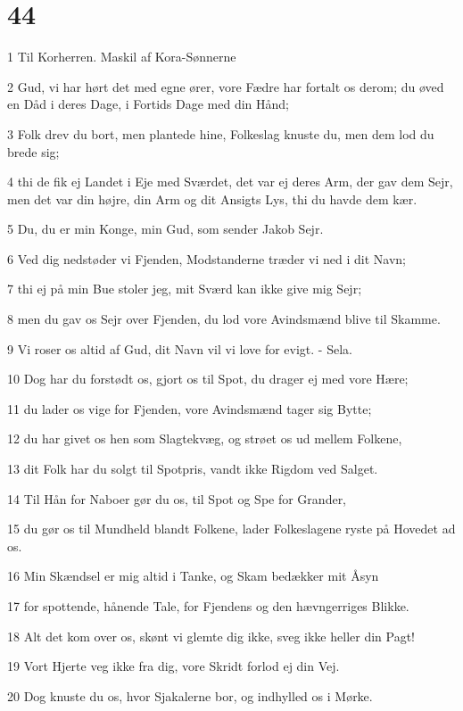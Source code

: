 \chapter{44}

\par 1 Til Korherren. Maskil af Kora-Sønnerne
\par 2 Gud, vi har hørt det med egne ører, vore Fædre har fortalt os derom; du øved en Dåd i deres Dage, i Fortids Dage med din Hånd;
\par 3 Folk drev du bort, men plantede hine, Folkeslag knuste du, men dem lod du brede sig;
\par 4 thi de fik ej Landet i Eje med Sværdet, det var ej deres Arm, der gav dem Sejr, men det var din højre, din Arm og dit Ansigts Lys, thi du havde dem kær.
\par 5 Du, du er min Konge, min Gud, som sender Jakob Sejr.
\par 6 Ved dig nedstøder vi Fjenden, Modstanderne træder vi ned i dit Navn;
\par 7 thi ej på min Bue stoler jeg, mit Sværd kan ikke give mig Sejr;
\par 8 men du gav os Sejr over Fjenden, du lod vore Avindsmænd blive til Skamme.
\par 9 Vi roser os altid af Gud, dit Navn vil vi love for evigt. - Sela.
\par 10 Dog har du forstødt os, gjort os til Spot, du drager ej med vore Hære;
\par 11 du lader os vige for Fjenden, vore Avindsmænd tager sig Bytte;
\par 12 du har givet os hen som Slagtekvæg, og strøet os ud mellem Folkene,
\par 13 dit Folk har du solgt til Spotpris, vandt ikke Rigdom ved Salget.
\par 14 Til Hån for Naboer gør du os, til Spot og Spe for Grander,
\par 15 du gør os til Mundheld blandt Folkene, lader Folkeslagene ryste på Hovedet ad os.
\par 16 Min Skændsel er mig altid i Tanke, og Skam bedækker mit Åsyn
\par 17 for spottende, hånende Tale, for Fjendens og den hævngerriges Blikke.
\par 18 Alt det kom over os, skønt vi glemte dig ikke, sveg ikke heller din Pagt!
\par 19 Vort Hjerte veg ikke fra dig, vore Skridt forlod ej din Vej.
\par 20 Dog knuste du os, hvor Sjakalerne bor, og indhylled os i Mørke.
